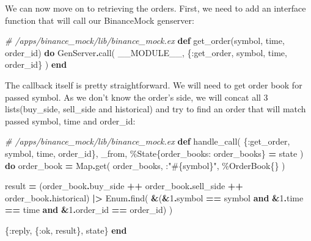 \documentclass[
  oneside]{book}
\newenvironment{Shaded}{\begin{snugshade}}{\end{snugshade}}
\newcommand{\CommentTok}[1]{\textcolor[rgb]{0.56,0.35,0.01}{\textit{#1}}}
\newcommand{\ConstantTok}[1]{\textcolor[rgb]{0.00,0.00,0.00}{#1}}
\newcommand{\DecValTok}[1]{\textcolor[rgb]{0.00,0.00,0.81}{#1}}
\newcommand{\KeywordTok}[1]{\textcolor[rgb]{0.13,0.29,0.53}{\textbf{#1}}}
\newcommand{\NormalTok}[1]{#1}
\newcommand{\OperatorTok}[1]{\textcolor[rgb]{0.81,0.36,0.00}{\textbf{#1}}}
\newcommand{\OtherTok}[1]{\textcolor[rgb]{0.56,0.35,0.01}{#1}}
\newcommand{\StringTok}[1]{\textcolor[rgb]{0.31,0.60,0.02}{#1}}
\newcommand{\VariableTok}[1]{\textcolor[rgb]{0.00,0.00,0.00}{#1}}
\begin{document}
We can now move on to retrieving the orders. First, we need to add an interface function that will call our BinanceMock genserver:

\begin{Shaded}
\begin{Highlighting}[]
\CommentTok{\# /apps/binance\_mock/lib/binance\_mock.ex}
  \KeywordTok{def}\NormalTok{ get\_order(symbol, time, order\_id) }\KeywordTok{do}
    \ConstantTok{GenServer}\OperatorTok{.}\NormalTok{call(}
      \ConstantTok{\_\_MODULE\_\_}\NormalTok{,}
\NormalTok{      \{}\VariableTok{:get\_order}\NormalTok{, symbol, time, order\_id\}}
\NormalTok{    )}
  \KeywordTok{end}
\end{Highlighting}
\end{Shaded}

The callback itself is pretty straightforward. We will need to get order book for passed symbol. As we don't know the order's side, we will concat all 3 lists(buy\_side, sell\_side and historical) and try to find an order that will
match passed symbol, time and order\_id:

\begin{Shaded}
\begin{Highlighting}[]
\CommentTok{\# /apps/binance\_mock/lib/binance\_mock.ex}
  \KeywordTok{def}\NormalTok{ handle\_call(}
\NormalTok{        \{}\VariableTok{:get\_order}\NormalTok{, symbol, time, order\_id\},}
\NormalTok{        \_from,}
\NormalTok{        \%}\ConstantTok{State}\NormalTok{\{}\VariableTok{order\_books:}\NormalTok{ order\_books\} }\OperatorTok{=}\NormalTok{ state}
\NormalTok{      ) }\KeywordTok{do}
\NormalTok{    order\_book }\OperatorTok{=}
      \ConstantTok{Map}\OperatorTok{.}\NormalTok{get(}
\NormalTok{        order\_books,}
\NormalTok{        :}\StringTok{"}\OtherTok{\#\{}\NormalTok{symbol}\OtherTok{\}}\StringTok{"}\NormalTok{,}
\NormalTok{        \%}\ConstantTok{OrderBook}\NormalTok{\{\}}
\NormalTok{      )}

\NormalTok{    result }\OperatorTok{=}
\NormalTok{      (order\_book}\OperatorTok{.}\NormalTok{buy\_side }\OperatorTok{++}
\NormalTok{         order\_book}\OperatorTok{.}\NormalTok{sell\_side }\OperatorTok{++}
\NormalTok{         order\_book}\OperatorTok{.}\NormalTok{historical)}
      \OperatorTok{|\textgreater{}} \ConstantTok{Enum}\OperatorTok{.}\NormalTok{find(}
        \OperatorTok{\&}\NormalTok{(}\OperatorTok{\&}\DecValTok{1}\OperatorTok{.}\NormalTok{symbol }\OperatorTok{==}\NormalTok{ symbol }\KeywordTok{and}
            \OperatorTok{\&}\DecValTok{1}\OperatorTok{.}\NormalTok{time }\OperatorTok{==}\NormalTok{ time }\KeywordTok{and}
            \OperatorTok{\&}\DecValTok{1}\OperatorTok{.}\NormalTok{order\_id }\OperatorTok{==}\NormalTok{ order\_id)}
\NormalTok{      )}

\NormalTok{    \{}\VariableTok{:reply}\NormalTok{, \{}\VariableTok{:ok}\NormalTok{, result\}, state\}}
  \KeywordTok{end}
\end{Highlighting}
\end{Shaded}
\end{document}
